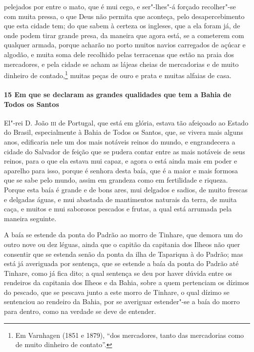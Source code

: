 \begin{linenumbers}
pelejados por entre o mato, que é mui cego, e ser"-lhes"-á forçado recolher"-se com muita
pressa, o que Deus não permita que aconteça, pelo desapercebimento que esta cidade tem; do
que sabem à certeza os ingleses, que a ela foram já, de onde podem tirar grande presa, da
maneira que agora está, se a cometerem com qualquer armada, porque acharão no porto muitos
navios carregados de açúcar e algodão, e muita soma dele recolhido pelas terracenas que
estão na praia dos mercadores, e pela cidade se acham as lájeas cheias de mercadorias e de
muito dinheiro de contado,\footnote{ Em Varnhagen (1851 e 1879), ``dos mercadores, tanto
das mercadorias como de muito dinheiro de contato''.} muitas peças de ouro e prata e
muitas alfaias de casa.

\paragraph{15 Em que se declaram as grandes qualidades que tem a Bahia de Todos os Santos} \quad
El"-rei D. João \textsc{iii} de Portugal, que está em glória, estava tão afeiçoado ao
Estado do Brasil, especialmente à Bahia de Todos os Santos, que, se vivera mais alguns
anos, edificaria nele um dos mais notáveis reinos do mundo, e engrandecera a cidade do
Salvador de feição que se pudera contar entre as mais notáveis de seus reinos, para o que
ela estava mui capaz, e agora o está ainda mais em poder e aparelho para isso, porque é
senhora desta baía, que é a maior e mais formosa que se sabe pelo mundo, assim em grandeza
como em fertilidade e riqueza. Porque esta baía é grande e de bons ares, mui delgados e
sadios, de muito frescas e delgadas águas, e mui abastada de mantimentos naturais da
terra, de muita caça, e muitos e mui saborosos pescados e frutas, a qual está arrumada
pela maneira seguinte.

A baía se estende da ponta do Padrão ao morro de Tinhare, que demora um do outro nove ou
dez léguas, ainda que o capitão da capitania dos Ilheos não quer consentir que se estenda
senão da ponta da ilha de Tapariqua à do Padrão; mas está já averiguada por sentença, que
se estende a baía da ponta do Padrão até Tinhare, como já fica dito; a qual sentença se
deu por haver dúvida entre os rendeiros da capitania dos Ilheos e da Bahia, sobre a quem
pertenciam os dízimos do pescado, que se pescava junto a este morro de Tinhare, o qual
dízimo se sentenciou ao rendeiro da Bahia, por se averiguar estender"-se a baía do morro
para dentro, como na verdade se deve de entender.


\end{linenumbers}

